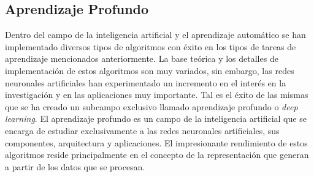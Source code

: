         

        
    \subsection{Aprendizaje Profundo}
    Dentro del campo de la inteligencia artificial y el aprendizaje automático se han implementado diversos tipos 
    de algoritmos con éxito en los tipos de tareas de aprendizaje mencionados anteriormente. La base teórica y los detalles 
    de implementación de estos algoritmos son muy variados, sin embargo, las redes neuronales artificiales han experimentado 
    un incremento en el interés en la investigación y en las aplicaciones muy importante. Tal es el éxito de las mismas 
    que se ha creado un subcampo exclusivo llamado aprendizaje profundo o \textit{deep learning}. El aprendizaje profundo 
    es un campo de la inteligencia artificial que se encarga de estudiar exclusivamente a las redes neuronales artificiales, 
    sus componentes, arquitectura y aplicaciones. El impresionante rendimiento de estos algoritmos reside principalmente en el 
    concepto de la representación que generan a partir de los datos que se procesan. 

